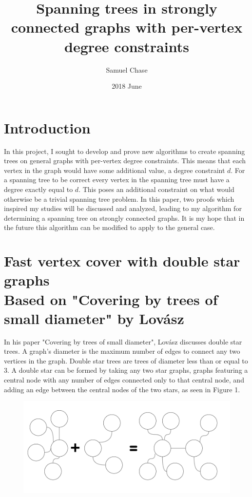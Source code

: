 \documentclass{article}
\title{Spanning trees in strongly connected graphs with per-vertex degree constraints}
\date{2018 June}
\author{Samuel Chase}
\begin{document}
	\maketitle
	
	\tableofcontents
	\newpage
	\section{Introduction}
	In this project, I sought to develop and prove new algorithms to create spanning trees on general graphs with per-vertex degree constraints. 
	This means that each vertex in the graph would have some additional value, a degree constraint $d$. For a spanning tree to be correct every vertex in the spanning tree must have a degree exactly equal to $d$. This poses an additional constraint on what
	would otherwise be a trivial spanning tree problem. In this paper, two proofs which inspired my studies will be discussed and analyzed, leading to my algorithm for determining a spanning tree on strongly connected graphs. It is my hope that in the future this algorithm can be modified to apply to the general case.
	
	
	
	\section{Fast vertex cover with double star graphs \\ {\small Based on "Covering by trees of small diameter" by Lov\'asz \cite{1}} }
	In his paper "Covering by trees of small diameter", Lov\'asz discusses double star trees. A graph's diameter is the maximum number of edges to connect any two vertices in the graph. Double star trees are trees of diameter less than or equal to 3. A double star can be formed by taking any two star graphs, graphs featuring a central node with any number of edges connected only to that central node, and adding an edge between the central nodes of the two stars, as seen in Figure 1.
	\begin{figure}[H]
		\caption{}
		\includegraphics{Figure1}
	\end{figure}
	
\end{document}
